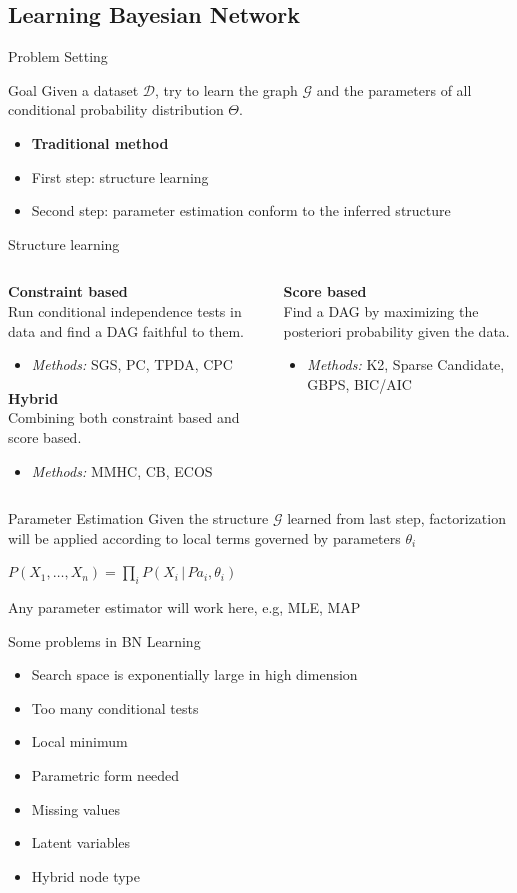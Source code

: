 \subsection{Learning Bayesian Network}
\begin{frame}{Problem Setting}
\begin{block}{Goal}
Given a dataset $\mathcal{D}$, try to learn the graph $\mathcal{G}$ and the
parameters of all conditional probability distribution $\Theta$.
\end{block}\pause
\begin{itemize}
\item[] \textbf{Traditional method}
	\item First step: structure learning
	\item Second step: parameter estimation conform to the inferred structure 
\end{itemize}
\end{frame}
\begin{frame}{Structure learning}
\begin{columns}
\begin{column}[t]{5cm}
\textbf{Constraint based}\\
Run conditional independence tests in 
data and find a DAG faithful to 
them. 
\begin{itemize}
\item \textit{Methods:} SGS, PC, TPDA, CPC 
\end{itemize}
\textbf{Hybrid}\\
Combining both constraint based and score based.
\begin{itemize}
\item \textit{Methods:} MMHC, CB, ECOS
\end{itemize}
\end{column}
\begin{column}[t]{5cm}
\textbf{Score based}\\
Find a DAG by maximizing the
posteriori probability given the data.
\begin{itemize}
\item \textit{Methods:} K2, Sparse Candidate, GBPS, BIC/AIC
\end{itemize}
\end{column}
\end{columns}
\end{frame}
\begin{frame}{Parameter Estimation}
Given the structure $\mathcal{G}$ learned from last step, factorization
will be applied according to local terms governed by parameters $\theta_i$
\begin{center}
$P(X_1,\ldots,X_n)=\prod_iP(X_i\,|\,Pa_i, \theta_i)$
\end{center}
Any parameter estimator will work here, e.g, MLE, MAP
\end{frame}
\begin{frame}{Some problems in BN Learning}
\begin{itemize}
\item Search space is exponentially large in high dimension
\item Too many conditional tests
\item Local minimum
\item Parametric form needed
\item Missing values
\item Latent variables
\item Hybrid node type
\end{itemize}
\end{frame}
